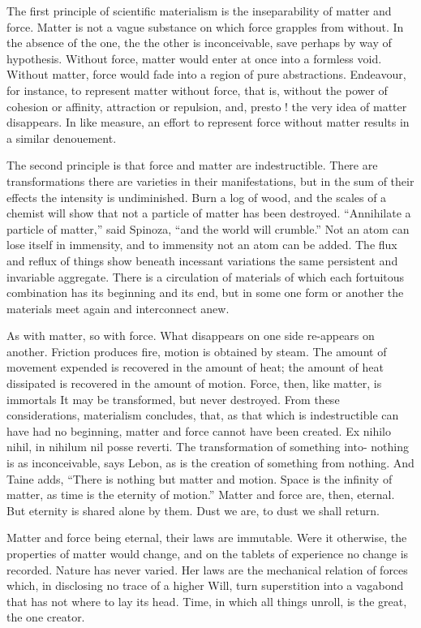 \documentclass[]{book}
\begin{document}
The first principle of scientific materialism is the inseparability of
matter and force. Matter is not a vague substance on which force
grapples from without. In the absence of the one, the the other is
inconceivable, save perhaps by way of hypothesis. Without force, matter
would enter at once into a formless void. Without matter, force would
fade into a region of pure abstractions. Endeavour, for instance, to
represent matter without force, that is, without the power of cohesion
or affinity, attraction or repulsion, and, presto ! the very idea of
matter disappears. In like measure, an effort to represent force without
matter results in a similar denouement.

The second principle is that force and matter are indestructible. There
are transformations there are varieties in their manifestations, but in
the sum of their effects the intensity is undiminished. Burn a log of
wood, and the scales of a chemist will show that not a particle of
matter has been destroyed. ``Annihilate a particle of matter,'' said
Spinoza, ``and the world will crumble.'' Not an atom can lose itself in
immensity, and to immensity not an atom can be added. The flux and
reflux of things show beneath incessant variations the same persistent
and invariable aggregate. There is a circulation of materials of which
each fortuitous combination has its beginning and its end, but in some
one form or another the materials meet again and interconnect anew.

As with matter, so with force. What disappears on one side re-appears on
another. Friction produces fire, motion is obtained by steam. The amount
of movement expended is recovered in the amount of heat; the amount of
heat dissipated is recovered in the amount of motion. Force, then, like
matter, is immortals It may be transformed, but never destroyed. From
these considerations, materialism concludes, that, as that which is
indestructible can have had no beginning, matter and force cannot have
been created. Ex nihilo nihil, in nihilum nil posse reverti. The
transformation of something into- nothing is as inconceivable, says
Lebon, as is the creation of something from nothing. And Taine adds,
``There is nothing but matter and motion. Space is the infinity of
matter, as time is the eternity of motion.'' Matter and force are, then,
eternal. But eternity is shared alone by them. Dust we are, to dust we
shall return.

Matter and force being eternal, their laws are immutable. Were it
otherwise, the properties of matter would change, and on the tablets of
experience no change is recorded. Nature has never varied. Her laws are
the mechanical relation of forces which, in disclosing no trace of a
higher Will, turn superstition into a vagabond that has not where to lay
its head. Time, in which all things unroll, is the great, the one
creator.
\end{document}
